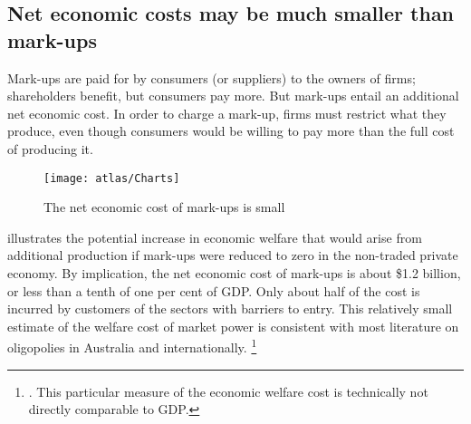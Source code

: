 
\clearpage

\subsection{Net economic costs may be much smaller than mark-ups}

Mark-ups are paid for by consumers (or suppliers) to the owners of firms; shareholders benefit, but consumers pay more.
But mark-ups entail an additional net economic cost. In order to charge a mark-up, firms must restrict what they produce, even though consumers would be willing to pay more than the full cost of producing it.

\begin{figure}
    \caption{The net economic cost of mark-ups is small  \label{fig:SNP-economic-cost}}
    \texttt{[image: atlas/Charts]} 
\end{figure}

 illustrates the potential increase in economic welfare that would arise from additional production if mark-ups were reduced to zero in the non-traded private economy.
By implication, the net economic cost of mark-ups is about \$1.2 billion, or less than a tenth of one per cent of GDP\@.
Only about half of the cost is incurred by customers of the sectors with barriers to entry. This relatively small estimate of the welfare cost of market power is consistent with most literature on oligopolies in Australia and internationally.%
    \footnote{\textcites{harberger1954monopoly}{worcester1973new}{hefford1978welfare}{ritz2016oligopolistic}. This particular measure of the economic welfare cost is technically not directly comparable to GDP.}

